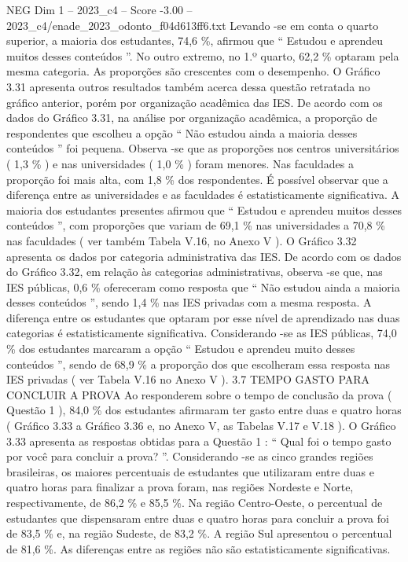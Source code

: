 \begin{textsample}{NEG Dim 1 – 2023\_c4 – Score -3.00 – 2023\_c4/enade\_2023\_odonto\_f04d613ff6.txt}
Levando -se em conta o quarto superior, a maioria dos estudantes, 74,6 \%, afirmou que “ Estudou e aprendeu muitos desses conteúdos ”.
No outro extremo, no 1.º quarto, 62,2 \% optaram pela mesma categoria.
As proporções são crescentes com o desempenho.
O Gráfico 3.31 apresenta outros resultados também acerca dessa questão retratada no gráfico anterior, porém por organização acadêmica das IES.
De acordo com os dados do Gráfico 3.31, na análise por organização acadêmica, a proporção de respondentes que escolheu a opção “ Não estudou ainda a maioria desses conteúdos ” foi pequena.
Observa -se que as proporções nos centros universitários ( 1,3 \% ) e nas universidades ( 1,0 \% ) foram menores.
Nas faculdades a proporção foi mais alta, com 1,8 \% dos respondentes.
É possível observar que a diferença entre as universidades e as faculdades é estatisticamente significativa.
A maioria dos estudantes presentes afirmou que “ Estudou e aprendeu muitos desses conteúdos ”, com proporções que variam de 69,1 \% nas universidades a 70,8 \% nas faculdades ( ver também Tabela V.16, no Anexo V ).
O Gráfico 3.32 apresenta os dados por categoria administrativa das IES.
De acordo com os dados do Gráfico 3.32, em relação às categorias administrativas, observa -se que, nas IES públicas, 0,6 \% ofereceram como resposta que “ Não estudou ainda a maioria desses conteúdos ”, sendo 1,4 \% nas IES privadas com a mesma resposta.
A diferença entre os estudantes que optaram por esse nível de aprendizado nas duas categorias é estatisticamente significativa.
Considerando -se as IES públicas, 74,0 \% dos estudantes marcaram a opção “ Estudou e aprendeu muito desses conteúdos ”, sendo de 68,9 \% a proporção dos que escolheram essa resposta nas IES privadas ( ver Tabela V.16 no Anexo V ). 3.7 TEMPO GASTO PARA CONCLUIR A PROVA Ao responderem sobre o tempo de conclusão da prova ( Questão 1 ), 84,0 \% dos estudantes afirmaram ter gasto entre duas e quatro horas ( Gráfico 3.33 a Gráfico 3.36 e, no Anexo V, as Tabelas V.17 e V.18 ).
O Gráfico 3.33 apresenta as respostas obtidas para a Questão 1 : “ Qual foi o tempo gasto por você para concluir a prova? ”.
Considerando -se as cinco grandes regiões brasileiras, os maiores percentuais de estudantes que utilizaram entre duas e quatro horas para finalizar a prova foram, nas regiões Nordeste e Norte, respectivamente, de 86,2 \% e 85,5 \%.
Na região Centro-Oeste, o percentual de estudantes que dispensaram entre duas e quatro horas para concluir a prova foi de 83,5 \% e, na região Sudeste, de 83,2 \%.
A região Sul apresentou o percentual de 81,6 \%.
As diferenças entre as regiões não são estatisticamente significativas.

\end{textsample}
